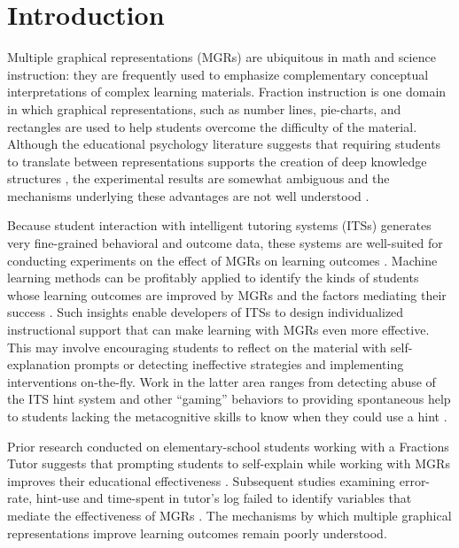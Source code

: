 \documentclass{edm_template}
\begin{document}

\section{Introduction}
\label{sec:introduction}

Multiple graphical representations (MGRs) are ubiquitous in math and science instruction: they are frequently used to emphasize complementary conceptual interpretations of complex learning materials. Fraction instruction is one domain in which graphical representations, such as number lines, pie-charts, and rectangles are used to help students overcome the difficulty of the material. Although the educational psychology literature suggests that requiring students to translate between representations supports the creation of deep knowledge structures \cite{Ambrose2010},  the experimental results are somewhat ambiguous \cite{Ainsworth1999} and the mechanisms underlying these advantages are not well understood \cite{Ainsworth2006}. 

Because student interaction with intelligent tutoring systems (ITSs) generates very fine-grained behavioral and outcome data, these systems are well-suited for conducting experiments on the effect of MGRs on learning outcomes \cite{Newell1981}. Machine learning methods can be profitably applied to identify the kinds of students whose learning outcomes are improved by MGRs and the factors mediating their success \cite{Self1986}. Such insights enable developers of ITSs to design individualized instructional support that can make learning with MGRs even more effective. This may involve encouraging students to reflect on the material with self-explanation prompts \cite{Rau2009} or detecting ineffective strategies and implementing interventions on-the-fly. Work in the latter area ranges from detecting abuse of the ITS hint system and other ``gaming'' behaviors \cite{Baker2009,Baker2009b} to providing spontaneous help to students lacking the metacognitive skills to know when they could use a hint \cite{Aleven2000,Aleven2003,Aleven2006}.

Prior research conducted on elementary-school students working with a Fractions Tutor suggests that prompting students to self-explain while working with MGRs improves their educational effectiveness \cite{Rau2009}. Subsequent studies examining error-rate, hint-use and time-spent in tutor's log failed to identify variables that mediate the effectiveness of MGRs \cite{Rau2012}. The mechanisms by which multiple graphical representations improve learning outcomes remain poorly understood.
\end{document}
